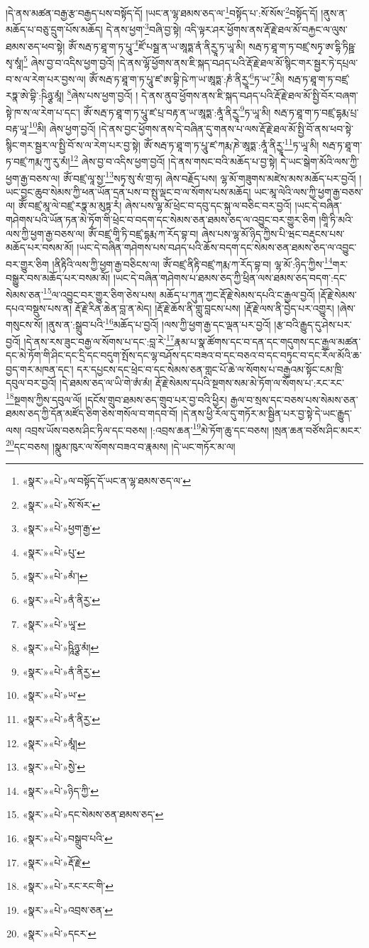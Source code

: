 །དེ་ནས་མཚན་བརྒྱ་རྩ་བརྒྱད་པས་བསྟོད་དོ། །ཡང་ན་ལྷ་ཐམས་ཅད་ལ་\footnote{«སྣར་»«པེ་»ལ་བསྟོད་དོ་ཡང་ན་ལྷ་ཐམས་ཅད་ལ་}བསྟོད་པ་:སོ་སོས་\footnote{«སྣར་»«པེ་»སོ་སོར་}བསྟོད་དོ། །ནུས་ན་མཆོད་པ་བཅུ་དྲུག་པོས་མཆོད། དེ་ནས་ཕྱག་\footnote{«སྣར་»«པེ་»ཕྱག་རྒྱ་}བཞི་བྱ་སྟེ། འདི་ལྟར་ཤར་ཕྱོགས་ནས་རྡོ་རྗེ་ཐལ་མོ་བརྐྱང་ལ་ལུས་ཐམས་ཅད་ཕབ་སྟེ། ཨོཾ་སརྦ་ཏ་ཐཱ་ག་ཏ་པཱུ་\footnote{«སྣར་»«པེ་»པུ་}ཛོ་པསྠ་ན་ཡ་ཨཱཏྨ་ནཾ་ནིརྱཱ་ཏ་ཡཱ་མི། སརྦ་ཏ་ཐཱ་ག་ཏ་བཛྲ་སཏྭ་ཨ་དྷི་ཏིཥྛ་སྭ་སཱཾ།\footnote{«སྣར་»«པེ་»མཾ་།} ཞེས་བྱ་བ་འདིས་ཕྱག་བྱའོ། །དེ་ནས་ལྷོ་ཕྱོགས་ནས་ཇི་སྐད་བཤད་པའི་རྡོ་རྗེ་ཐལ་མོ་སྙིང་གར་སྦྱར་ཏེ་དཔྲལ་བ་ས་ལ་རེག་པར་བྱས་ལ། ཨོཾ་སརྦ་ཏ་ཐཱ་ག་ཏ་པཱུ་ཛ་ཨ་བྷི་ཥེ་ཀ་ཡ་ཨཱཏྨ་:ཎཾ་ནིརྱཱ་\footnote{«སྣར་»«པེ་»ནཾ་ནིརྱ་}ཏ་ཡ་\footnote{«སྣར་»«པེ་»ཡཱ་}མི། སརྦ་ཏ་ཐཱ་ག་ཏ་བཛྲ་རཏྣ་ཨེ་བྷི་:ཥིཉྩ་མཱཾ། \footnote{«སྣར་»«པེ་»ཥཱིཉྩ་མཾ། }ཞེས་པས་ཕྱག་བྱའོ། །
དེ་ནས་ནུབ་ཕྱོགས་ནས་ཇི་སྐད་བཤད་པའི་རྡོ་རྗེ་ཐལ་མོ་སྤྱི་བོར་བཞག་སྟེ་ཁ་ས་ལ་རེག་པ་དང་། ཨོཾ་སརྦ་ཏ་ཐཱ་ག་ཏ་པཱུ་ཛ་པྲ་བརྟ་ན་ཡ་ཨཱཏྨ་:ནཱཾ་ནིརྱཱ་\footnote{«སྣར་»«པེ་»ནཾ་ནིརྱ་}ཏ་ཡཱ་མི། སརྦ་ཏ་ཐཱ་ག་ཏ་བཛྲ་དྷརྨ་པྲ་བརྟ་ཡཱ་\footnote{«སྣར་»«པེ་»ཡ་}མི། ཞེས་ཕྱག་བྱའོ། །དེ་ནས་བྱང་ཕྱོགས་ནས་དེ་བཞིན་དུ་གནས་པ་ལས་རྡོ་རྗེ་ཐལ་མོ་སྤྱི་བོ་ནས་ཕབ་སྟེ་སྙིང་གར་སྦྱར་ལ་སྤྱི་བོ་ས་ལ་རེག་པར་བྱ་སྟེ། ཨོཾ་སརྦ་ཏ་ཐཱ་ག་ཏ་པཱུ་ཛ་ཀརྨ་ཎེ་ཨཱཏྨ་:ནཱཾ་ནིརྱཱ་\footnote{«སྣར་»«པེ་»ནཾ་ནིརྱ་}ཏ་ཡཱ་མི། སརྦ་ཏ་ཐཱ་ག་ཏ་བཛྲ་ཀརྨ་ཀུ་རུ་མཾ།\footnote{«སྣར་»«པེ་»མཱཾ།} ཞེས་བྱ་བ་འདིས་ཕྱག་བྱའོ། །དེ་ནས་གསང་བའི་མཆོད་པ་བྱ་སྟེ། དེ་ཡང་སྒེག་མོའི་ལས་ཀྱི་ཕྱག་རྒྱ་བཅས་ལ། ཨོཾ་བཛྲ་ལཱ་སྱ་\footnote{«སྣར་»«པེ་»སྱེ་}སཏྭ་སུ་སཾ་གྲ་ཧ། ཞེས་བརྗོད་པས། ལྷ་མོ་གཟུགས་མཛེས་མས་མཆོད་པར་བྱའོ། །ཡང་བྱང་ཆུབ་སེམས་ཀྱི་ཕན་ཡོན་དྲན་པས་བ་སྤུ་ལྡང་བ་ལ་སོགས་པས་མཆོད། ཡང་མཱ་ལེའི་ལས་ཀྱི་ཕྱག་རྒྱ་བཅས་ལ། ཨོཾ་བཛྲ་མཱ་ལེ་བཛྲ་རཏྣ་མ་མུཏྟ་རཾ། ཞེས་པས་ལྷ་མོ་ཕྲེང་བ་དབུ་དང་སྐུ་ལ་བཅིང་བར་བྱའོ། །ཡང་དེ་བཞིན་གཤེགས་པའི་ཡོན་ཏན་མེ་ཏོག་གི་ཕྲེང་བ་བདག་དང་སེམས་ཅན་ཐམས་ཅད་ལ་འབྱུང་བར་གྱུར་ཅིག །གཱི་ཏི་མའི་ལས་ཀྱི་ཕྱག་རྒྱ་བཅས་ལ། ཨོཾ་བཛྲ་གཱི་ཏི་བཛྲ་དྷརྨ་ཀ་རོད་བྷ་བ། ཞེས་པས་ལྷ་མོ་ཉིད་ཀྱིས་པི་ཝང་བརྡུངས་པས་མཆོད་པར་བསམ་མོ། །ཡང་དེ་བཞིན་གཤེགས་པས་བཤད་པའི་ཆོས་བདག་དང་སེམས་ཅན་ཐམས་ཅད་ལ་འབྱུང་བར་གྱུར་ཅིག །ནིརྟིའི་ལས་ཀྱི་ཕྱག་རྒྱ་བཅིངས་ལ། ཨོཾ་བཛྲ་ནིརྟི་བཛྲ་ཀརྨ་ཀ་རོད་བྷ་བ། ལྷ་མོ་:ཉིད་ཀྱིས་\footnote{«སྣར་»«པེ་»ཉིད་ཀྱི་}གར་བསྒྱུར་བས་མཆོད་པར་བསམ་མོ། །ཡང་དེ་བཞིན་གཤེགས་པ་ཐམས་ཅད་ཀྱི་ཕྲིན་ལས་ཐམས་ཅད་བདག་:དང་སེམས་ཅན་\footnote{«སྣར་»«པེ་»དང་སེམས་ཅན་ཐམས་ཅད་}ལ་འབྱུང་བར་གྱུར་ཅིག་ཅེས་པས། མཆོད་པ་ཀུན་ཀྱང་རྡོ་རྗེ་སེམས་དཔའི་ང་རྒྱལ་བྱའོ། །རྡོ་རྗེ་སེམས་དཔའ་བསྡུས་པས་ན། རྡོ་རྗེ་རིན་ཆེན་བླ་ན་མེད། །རྡོ་རྗེ་ཆོས་ནི་གླུ་བླངས་པས། །རྡོ་རྗེ་ལས་ནི་བྱེད་པར་འགྱུར། །ཞེས་གསུངས་སོ། །ནུས་ན་:སྒྲུབ་པའི་\footnote{«སྣར་»«པེ་»བསྒྲུབ་པའི་}མཆོད་པ་བྱའོ། །ལས་ཀྱི་ཕྱག་རྒྱ་དང་ལྡན་པར་བྱའོ། །རྩ་བའི་རྒྱུད་དུ་ཤེས་པར་བྱའོ། །དེ་ནས་རས་ཟུང་བརྒྱ་ལ་སོགས་པ་དང་:བླ་རེ་\footnote{«སྣར་»«པེ་»རྡོ་རྗེ་}རྣམ་པ་སྣ་ཚོགས་དང་བ་དན་དང་གདུགས་དང་རྒྱལ་མཚན་དང་མེ་ཏོག་གི་ཤིང་དང་དྲི་དང་བདུག་སྤོས་དང་ལྷ་བཤོས་དང་བཟའ་བ་དང་བཅའ་བ་དང་བཏུང་བ་དང་རོལ་མོའི་ཆ་བྱད་གར་མཁན་དང་། དར་དཔྱངས་དང་ཕྲེང་བ་དང་སེམས་ཅན་གླང་པོ་ཆེ་ལ་སོགས་པ་བརྒྱའམ་སྟོང་ངམ་ཁྲི་དབུལ་བར་བྱའོ། །དེ་ཐམས་ཅད་ལ་ཡི་གེ་ཨཾ་མཾ། རྡོ་རྗེ་སེམས་དཔའི་སྔགས་སམ་མེ་ཏོག་ལ་སོགས་པ་:རང་རང་\footnote{«སྣར་»«པེ་»རང་རང་གི་}སྔགས་ཀྱིས་དབུལ་ལོ། །དངོས་གྲུབ་ཐམས་ཅད་གྲུབ་པར་བྱ་བའི་ཕྱིར། རྒྱལ་བ་སྲས་དང་བཅས་པས་སེམས་ཅན་ཐམས་ཅད་ཀྱི་དོན་མཛོད་ཅིག་ཅེས་གསོལ་བ་གདབ་བོ། །དེ་ནས་ཕྱི་རོལ་དུ་གཏོར་མ་སྦྱིན་པར་བྱ་སྟེ་དེ་ཡང་རྒྱུད་ལས། འབྲས་ཡོས་བཅས་ཤིང་ཏིལ་དང་བཅས། །:འབྲས་ཆན་\footnote{«སྣར་»«པེ་»འབྲས་ཅན་}མེ་ཏོག་ཆུ་དང་བཅས། །སྲན་ཆན་བཙོས་ཤིང་མངར་\footnote{«སྣར་»«པེ་»དངར་}དང་བཅས། །སྣུམ་ཁུར་ལ་སོགས་བཟའ་བ་རྣམས། །དེ་ཡང་གཏོར་མ་ལ། 